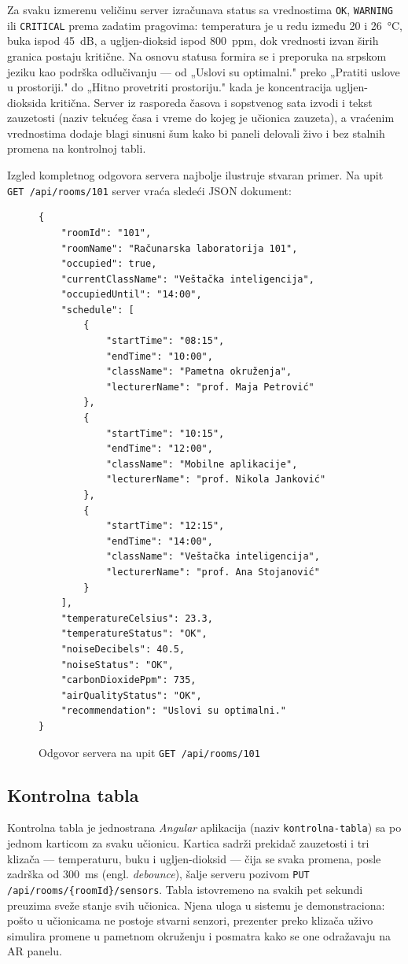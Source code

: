 Za svaku izmerenu veličinu server izračunava status sa vrednostima \texttt{OK}, \texttt{WARNING} ili \texttt{CRITICAL} prema zadatim pragovima: temperatura je u redu između 20 i 26~°C, buka ispod 45~dB, a ugljen-dioksid ispod 800~ppm, dok vrednosti izvan širih granica postaju kritične. Na osnovu statusa formira se i preporuka na srpskom jeziku kao podrška odlučivanju --- od „Uslovi su optimalni." preko „Pratiti uslove u prostoriji." do „Hitno provetriti prostoriju." kada je koncentracija ugljen-dioksida kritična. Server iz rasporeda časova i sopstvenog sata izvodi i tekst zauzetosti (naziv tekućeg časa i vreme do kojeg je učionica zauzeta), a vraćenim vrednostima dodaje blagi sinusni šum kako bi paneli delovali živo i bez stalnih promena na kontrolnoj tabli.

Izgled kompletnog odgovora servera najbolje ilustruje stvaran primer. Na upit \texttt{GET /api/rooms/101} server vraća sledeći JSON dokument:

\begin{figure}[H]
\begin{verbatim}
{
    "roomId": "101",
    "roomName": "Računarska laboratorija 101",
    "occupied": true,
    "currentClassName": "Veštačka inteligencija",
    "occupiedUntil": "14:00",
    "schedule": [
        {
            "startTime": "08:15",
            "endTime": "10:00",
            "className": "Pametna okruženja",
            "lecturerName": "prof. Maja Petrović"
        },
        {
            "startTime": "10:15",
            "endTime": "12:00",
            "className": "Mobilne aplikacije",
            "lecturerName": "prof. Nikola Janković"
        },
        {
            "startTime": "12:15",
            "endTime": "14:00",
            "className": "Veštačka inteligencija",
            "lecturerName": "prof. Ana Stojanović"
        }
    ],
    "temperatureCelsius": 23.3,
    "temperatureStatus": "OK",
    "noiseDecibels": 40.5,
    "noiseStatus": "OK",
    "carbonDioxidePpm": 735,
    "airQualityStatus": "OK",
    "recommendation": "Uslovi su optimalni."
}
\end{verbatim}
\caption{Odgovor servera na upit \texttt{GET /api/rooms/101}}
\end{figure}

\subsection{Kontrolna tabla}

Kontrolna tabla je jednostrana \textit{Angular} aplikacija (naziv \texttt{kontrolna-tabla}) sa po jednom karticom za svaku učionicu. Kartica sadrži prekidač zauzetosti i tri klizača --- temperaturu, buku i ugljen-dioksid --- čija se svaka promena, posle zadrška od 300~ms (engl. \textit{debounce}), šalje serveru pozivom \texttt{PUT /api/rooms/\{roomId\}/sensors}. Tabla istovremeno na svakih pet sekundi preuzima sveže stanje svih učionica. Njena uloga u sistemu je demonstraciona: pošto u učionicama ne postoje stvarni senzori, prezenter preko klizača uživo simulira promene u pametnom okruženju i posmatra kako se one odražavaju na AR panelu.

